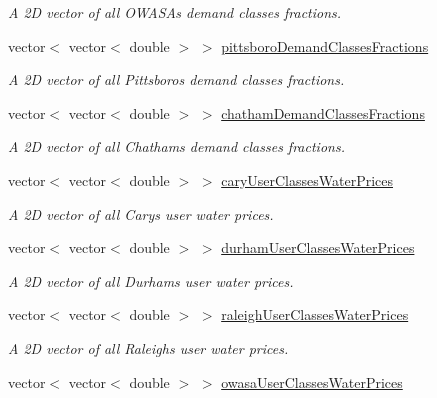 \begin{DoxyCompactItemize}
\begin{DoxyCompactList}\small\item\em A 2D vector of all O\+W\+A\+SA\textquotesingle{}s demand classes fractions. \end{DoxyCompactList}\item 
vector$<$ vector$<$ double $>$ $>$ \mbox{\hyperlink{classTriangle_a7234ceaf16855ec0cad968643af11b1d}{pittsboro\+Demand\+Classes\+Fractions}}
\begin{DoxyCompactList}\small\item\em A 2D vector of all Pittsboro\textquotesingle{}s demand classes fractions. \end{DoxyCompactList}\item 
vector$<$ vector$<$ double $>$ $>$ \mbox{\hyperlink{classTriangle_af3d25799904b5216e8eaa69d047720e6}{chatham\+Demand\+Classes\+Fractions}}
\begin{DoxyCompactList}\small\item\em A 2D vector of all Chatham\textquotesingle{}s demand classes fractions. \end{DoxyCompactList}\item 
vector$<$ vector$<$ double $>$ $>$ \mbox{\hyperlink{classTriangle_afdd592d6d1c494ac598aa293fc99bed5}{cary\+User\+Classes\+Water\+Prices}}
\begin{DoxyCompactList}\small\item\em A 2D vector of all Cary\textquotesingle{}s user water prices. \end{DoxyCompactList}\item 
vector$<$ vector$<$ double $>$ $>$ \mbox{\hyperlink{classTriangle_ab1b016ce397014e287ae5a213b04643d}{durham\+User\+Classes\+Water\+Prices}}
\begin{DoxyCompactList}\small\item\em A 2D vector of all Durham\textquotesingle{}s user water prices. \end{DoxyCompactList}\item 
vector$<$ vector$<$ double $>$ $>$ \mbox{\hyperlink{classTriangle_a626cdfe51d52c966bda22de9afc237f7}{raleigh\+User\+Classes\+Water\+Prices}}
\begin{DoxyCompactList}\small\item\em A 2D vector of all Raleigh\textquotesingle{}s user water prices. \end{DoxyCompactList}\item 
vector$<$ vector$<$ double $>$ $>$ \mbox{\hyperlink{classTriangle_a8501e1edfb25770f4f06fc9e57e274c2}{owasa\+User\+Classes\+Water\+Prices}}

\end{DoxyCompactItemize}

